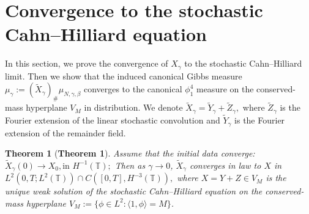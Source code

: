 \documentclass{article}
\newtheorem{theorem}{Theorem}
\begin{document}
\section{Convergence to the stochastic Cahn--Hilliard equation}
\label{sec:limit}

In this section, we prove the convergence of \(X_\gamma\) to the stochastic Cahn--Hilliard limit. Then we show that the induced canonical Gibbs measure \(
\mu_\gamma:=(\widetilde X_\gamma)_\#\mu_{N,\gamma,\beta}
\) converges to the canonical $\phi^4_1$ measure on the conserved-mass hyperplane $V_M$ in distribution.
We denote 
\(
\widetilde X_\gamma=\widetilde Y_\gamma+\widetilde Z_\gamma,
\)
where \(\widetilde Z_\gamma\) is the Fourier extension of the linear stochastic convolution and
\(\widetilde Y_\gamma\) is the Fourier extension of the remainder field.

\begin{theorem}[\textbf{Theorem 1}]
\label{thm:Xgamma-final-convergence}
Assume that the initial data converge:
\(
\widetilde X_\gamma(0)\rightarrow X_0, \text{in }H^{-1}(\mathbb T);
\)
Then as $\gamma \to 0$, 
\(
\widetilde X_\gamma\) converges in law to \(X
\)
in
\(
L^2(0,T;L^2(\mathbb T))\cap C([0,T],H^{-3}(\mathbb T)),
\)
where \(X = Y+Z \in V_M \) is the unique weak solution of the stochastic Cahn--Hilliard equation on the conserved-mass hyperplane \( V_M := \{ \phi \in L^2: \langle 1,\phi \rangle = M \}\).
\end{theorem}
\end{document}
